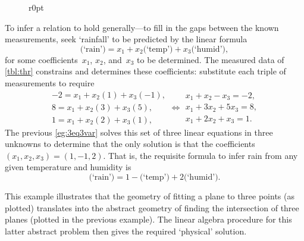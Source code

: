 \begin{example}
\begin{solution} 
\begin{figure}r{0pt}
\end{figure}
To infer a relation to hold generally---to fill in the gaps between the known measurements, seek `rainfall' to be predicted by the linear formula
\begin{equation*}
\text{(`rain')}=x_1+x_2\text{(`temp')}+x_3\text{(`humid')},
\end{equation*}
for some coefficients~\(x_1\), \(x_2\), and~\(x_3\) to be determined.
The measured data of \cref{tbl:thr} constrains and determines these coefficients:
substitute each triple of measurements to require
\begin{equation*}
\begin{array}{l}
-2=x_1+x_2(1)+x_3(-1),
\\ 8=x_1+x_2(3)+x_3(5),
\\1=x_1+x_2(2)+x_3(1),
\end{array}
\iff
\begin{array}{l}
x_1+x_2-x_3=-2,
\\ x_1+3x_2+5x_3=8,
\\x_1+2x_2+x_3=1.
\end{array}
\end{equation*}
The previous \cref{eg:3eq3var} solves this set of three linear equations in three unknowns to determine that the only solution is that the coefficients \((x_1,x_2,x_3)=(1,-1,2)\).
That is, the requisite formula to infer rain from any given temperature and humidity is 
\begin{equation*}
\text{(`rain')}=1-\text{(`temp')}+2\text{(`humid')}.
\end{equation*}

This example illustrates that the geometry of fitting a plane to three points (as plotted) translates into the abstract geometry of finding the intersection of three planes (plotted in the previous example).
The linear algebra procedure for this latter abstract problem then gives the required `physical' solution.
\end{solution}
\end{example}


